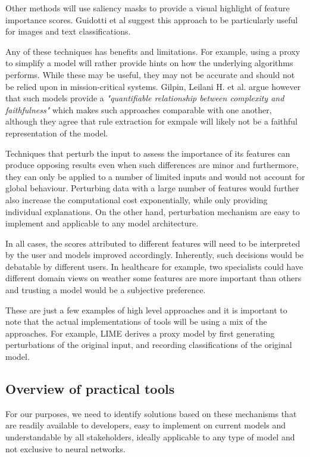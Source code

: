 \documentclass[proposal]{softeng}
\begin{document}
Other methods will use saliency masks to provide a visual highlight of feature importance scores. Guidotti et al suggest this approach to be particularly useful for images and text classifications.

Any of these techniques has benefits and limitations. For example, using a proxy to simplify a model will rather provide hints on how the underlying algorithms performs. While these may be useful, they may not be accurate and should not be relied upon in mission-critical systems. Gilpin, Leilani H. et al.\cite{GilpinLeilaniH} argue however that such models provide a \textit{"quantifiable relationship between
complexity and faithfulness"} which makes such approaches comparable with one another, although they agree that rule extraction for exmpale will likely not be a faithful representation of the model.

Techniques that perturb the input to assess the importance of its features can produce opposing results even when such differences are minor and furthermore, they can only be applied to a number of limited inputs and would not account for global behaviour. Perturbing data with a large number of features would further also increase the computational cost exponentially, while only providing individual explanations. On the other hand, perturbation mechanism  are easy to implement and applicable to any model architecture.


In all cases, the scores attributed to different features will need to be interpreted by the user and models improved accordingly. Inherently, such decisions would be debatable by different users. In healthcare for example, two specialists could have different domain views on weather some features are more important than others and trusting a model would be a subjective preference.

These are just a few examples of high level approaches and it is important to note that the actual implementations of tools will be using a mix of the approaches. For example, LIME \cite{RibeiroMarcoTulio2016WSIT} derives a proxy model by  first generating perturbations  of the original input, and recording classifications of the original model.

\subsection{Overview of practical tools}
For our purposes, we need to identify solutions based on these mechanisms that are readily available to developers, easy to implement on current models and understandable by all stakeholders, ideally applicable to any type of model and not exclusive to neural networks.
\end{document}
